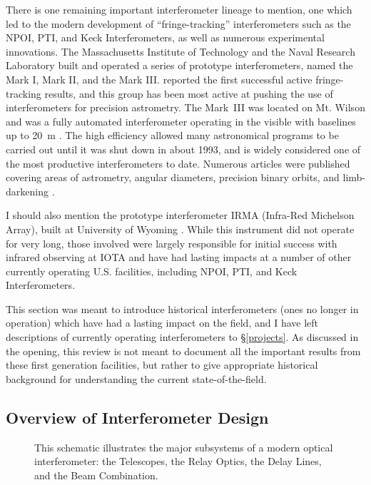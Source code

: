 \documentclass[12pt]{iopart}
\begin{document}
There is one remaining important interferometer lineage to mention,
one which led to the modern development of ``fringe-tracking''
interferometers such as the NPOI, PTI, and Keck Interferometers, as
well as numerous experimental innovations.  The Massachusetts
Institute of Technology and the Naval Research Laboratory built and
operated a series of prototype interferometers, named the Mark I, Mark
II, and the Mark III.  \citet{shao1980} reported the first successful
active fringe-tracking results, and this group has been most active at
pushing the use of interferometers for precision astrometry.  The
Mark~III was located on Mt. Wilson and was a fully automated
interferometer operating in the visible with baselines up to 20~m
\citep{markiii}.  The high efficiency allowed many astronomical
programs to be carried out until it was shut down in about 1993,
and is widely considered one of the most productive interferometers to date.
Numerous articles were published covering areas of astrometry, angular
diameters, precision binary orbits, and limb-darkening
\citep[e.g.,][]{mozurk1988,hutter1989,mozurk1991,armstrong1992,
hummel1995,quirrenbach1996}.

I should also mention the prototype interferometer IRMA (Infra-Red
Michelson Array), built at University of Wyoming \citep{dyck1993}.
While this instrument did not operate for very long, those involved
were largely responsible for initial success with infrared observing
at IOTA and have had lasting impacts at a number of other currently
operating U.S. facilities, including NPOI, PTI, and Keck
Interferometers.

This section was meant to introduce historical interferometers (ones
no longer in operation) which have had a lasting impact on the field,
and I have left descriptions of currently operating interferometers to
\S\ref{projects}.  As discussed in the opening, this review is not
meant to document all the important results from these first
generation facilities, but rather to give appropriate historical
background for understanding the current state-of-the-field.

\subsection{Overview of Interferometer Design}


\begin{figure}
\begin{center}
\caption{This schematic illustrates the major subsystems of a modern
optical interferometer: the Telescopes, the Relay Optics, the Delay Lines,
and the Beam Combination.
\label{fig_realinterferometer}}
\end{center}
\end{figure}
\end{document}
